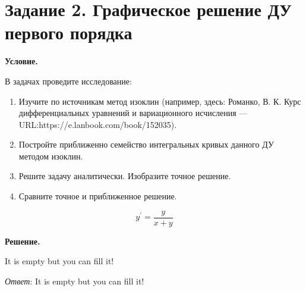 \section{Задание 2. Графическое решение ДУ первого порядка}

\textbf{Условие.}

В задачах проведите исследование:
\begin{enumerate}
    \item Изучите по источникам метод изоклин (например, здесь: Романко, В. К. Курс дифференциальных уравнений и вариационного исчисления — URL:https://e.lanbook.com/book/152035).

    \item Постройте приближенно семейство интегральных кривых данного ДУ методом изоклин.

    \item Решите задачу аналитически. Изобразите точное решение.

    \item Сравните точное и приближенное решение.
\end{enumerate}

\[y^\prime = \frac{y}{x + y}\]

\vspace{10mm}
\textbf{Решение.}

It is empty but you can fill it!

\textit{Ответ}: It is empty but you can fill it!

